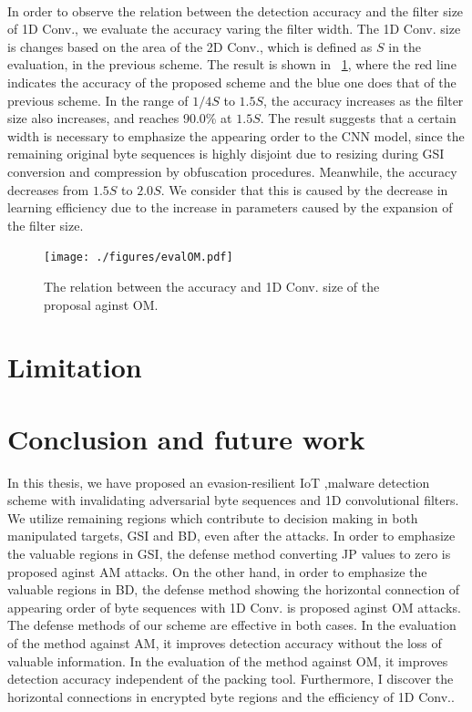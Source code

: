 \documentclass{ieeeaccess}
\begin{document}
\paragraph*{}
In order to observe the relation between the detection accuracy and the filter size of 1D Conv., we evaluate the accuracy varing the filter width.
The 1D Conv. size is changes based on the area of the 2D Conv., which is defined as $S$ in the evaluation, in the previous scheme.
The result is shown in \figurename~\ref{fig:evalOM}, where the red line indicates the accuracy of the proposed scheme and the blue one does that of the previous scheme.
In the range of $1/4S$ to $1.5S$, the accuracy increases as the filter size also increases, and reaches 90.0\% at $1.5S$.
The result suggests that a certain width is necessary to emphasize the appearing order to the CNN model, since the remaining original byte sequences is highly disjoint due to resizing during GSI conversion and compression by obfuscation procedures.
Meanwhile, the accuracy decreases from $1.5S$ to $2.0S$.
We consider that this is caused by the decrease in learning efficiency due to the increase in parameters caused by the expansion of the filter size.

\begin{figure}[t]
 \centering
 \texttt{[image: ./figures/evalOM.pdf]}
 \caption{The relation between the accuracy and 1D Conv. size of the proposal aginst OM.} 
 \label{fig:evalOM}
\end{figure}

\section{Limitation} \label{sec:limitation}
\section{Conclusion and future work} \label{sec:conclusion}
In this thesis, we have proposed an evasion-resilient IoT ,malware detection scheme with invalidating adversarial byte sequences and 1D convolutional filters. 
We utilize remaining regions which contribute to decision making in both manipulated targets, GSI and BD, even after the attacks.
In order to emphasize the valuable regions in GSI, the defense method converting JP values to zero is proposed aginst AM attacks.
On the other hand, in order to emphasize the valuable regions in BD, the defense method showing the horizontal connection of appearing order of byte sequences with 1D Conv. is proposed aginst OM attacks.
The defense methods of our scheme are effective in both cases.
In the evaluation of the method against AM, it improves detection accuracy without the loss of valuable information.
In the evaluation of the method against OM, it improves detection accuracy independent of the packing tool.
Furthermore, I discover the horizontal connections in encrypted byte regions and the efficiency of 1D Conv..
\end{document}
